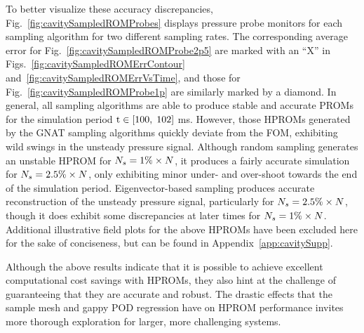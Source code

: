 To better visualize these accuracy discrepancies, Fig.~\ref{fig:cavitySampledROMProbes} displays pressure probe monitors for each sampling algorithm for two different sampling rates. The corresponding average error for Fig.~\ref{fig:cavitySampledROMProbe2p5} are marked with an ``X'' in Figs.~\ref{fig:cavitySampledROMErrContour} and~\ref{fig:cavitySampledROMErrVsTime}, and those for Fig.~\ref{fig:cavitySampledROMProbe1p} are similarly marked by a diamond. In general, all sampling algorithms are able to produce stable and accurate PROMs for the simulation period $\text{t} \in [100, \; 102]$ ms. However, those HPROMs generated by the GNAT sampling algorithms quickly deviate from the FOM, exhibiting wild swings in the unsteady pressure signal. Although random sampling generates an unstable HPROM for $N_s = 1\% \times N$, it produces a fairly accurate simulation for $N_s = 2.5\% \times N$, only exhibiting minor under- and over-shoot towards the end of the simulation period. Eigenvector-based sampling produces accurate reconstruction of the unsteady pressure signal, particularly for $N_s = 2.5\% \times N$, though it does exhibit some discrepancies at later times for $N_s = 1\% \times N$. Additional illustrative field plots for the above HPROMs have been excluded here for the sake of conciseness, but can be found in Appendix~\ref{app:cavitySupp}.

Although the above results indicate that it is possible to achieve excellent computational cost savings with HPROMs, they also hint at the challenge of guaranteeing that they are accurate and robust. The drastic effects that the sample mesh and gappy POD regression have on HPROM performance invites more thorough exploration for larger, more challenging systems.